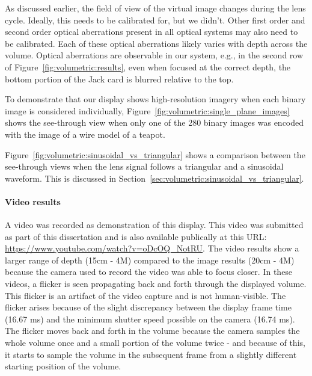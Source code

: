 As discussed earlier, the field of view of the virtual image changes during the lens cycle. Ideally, this needs to be calibrated for, but we didn't. Other first order and second order optical aberrations present in all optical systems may also need to be calibrated. Each of these optical aberrations likely varies with depth across the volume. Optical aberrations are observable in our system, e.g., in the second row of Figure~\ref{fig:volumetric:results}, even when focused at the correct depth, the bottom portion of the Jack card is blurred relative to the top. 

To demonstrate that our display shows high-resolution imagery when each binary image is considered individually, Figure~\ref{fig:volumetric:single_plane_images} shows the see-through view when only one of the 280 binary images was encoded with the image of a wire model of a teapot. 


Figure~\ref{fig:volumetric:sinusoidal_vs_triangular} shows a comparison between the see-through views when the lens signal follows a triangular and a sinusoidal waveform. This is discussed in Section~\ref{sec:volumetric:sinusoidal_vs_triangular}.


\paragraph{Video results}
A video was recorded as demonstration of this display. This video was submitted as part of this dissertation and is also available publically at this URL: \url{https://www.youtube.com/watch?v=oDcOQ_NotRU}. 
The video results show a larger range of depth (15cm - 4M) compared to the image results (20cm - 4M) because the camera used to record the video was able to focus closer. In these videos, a flicker is seen propagating back and forth through the displayed volume. This flicker is an artifact of the video capture and is not human-visible. The flicker arises because of the slight discrepancy between the display frame time (16.67 ms) and the minimum shutter speed possible on the camera (16.74 ms). The flicker moves back and forth in the volume because the camera samples the whole volume once and a small portion of the volume twice - and because of this, it starts to sample the volume in the subsequent frame from a slightly different starting position of the volume. 


